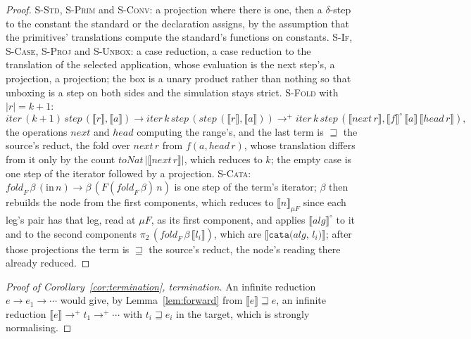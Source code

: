 \begin{proof}
\textsc{S-Std}, \textsc{S-Prim} and \textsc{S-Conv}: a projection where there is one, then a $\delta$-step to the constant the standard or the declaration assigns, by the assumption that the primitives' translations compute the standard's functions on constants.
\textsc{S-If}, \textsc{S-Case}, \textsc{S-Proj} and \textsc{S-Unbox}: a case reduction, a case reduction to the translation of the selected application, whose evaluation is the next step's, a projection, a projection; the box is a unary product rather than nothing so that unboxing is a step on both sides and the simulation stays strict.
\textsc{S-Fold} with $|r| = k + 1$:
\[ \mathit{iter}\,(k{+}1)\,\mathit{step}\,(\llbracket r \rrbracket, \llbracket a \rrbracket) \longrightarrow \mathit{iter}\,k\,\mathit{step}\,(\mathit{step}\,(\llbracket r \rrbracket, \llbracket a \rrbracket)) \longrightarrow^{+} \mathit{iter}\,k\,\mathit{step}\,(\llbracket \mathit{next}\,r \rrbracket, \llbracket f \rrbracket^{\!\circ}\,\llbracket a \rrbracket\,\llbracket \mathit{head}\,r \rrbracket), \]
the operations $\mathit{next}$ and $\mathit{head}$ computing the range's, and the last term is $\sqsupseteq$ the source's reduct, the fold over $\mathit{next}\,r$ from $f(a, \mathit{head}\,r)$, whose translation differs from it only by the count $\mathit{toNat}\,|\llbracket \mathit{next}\,r \rrbracket|$, which reduces to $k$; the empty case is one step of the iterator followed by a projection.
\textsc{S-Cata}: $\mathit{fold}_F\,\beta\,(\mathrm{in}\,n) \longrightarrow \beta\,(F(\mathit{fold}_F\,\beta)\,n)$ is one step of the term's iterator; $\beta$ then rebuilds the node from the first components, which reduces to $\llbracket n \rrbracket_{\mu F}$ since each leg's pair has that leg, read at $\mu F$, as its first component, and applies $\llbracket \mathit{alg} \rrbracket^{\!\circ}$ to it and to the second components $\pi_2\,(\mathit{fold}_F\,\beta\,\llbracket l_i \rrbracket)$, which are $\llbracket \texttt{cata(}\mathit{alg}\texttt{, }l_i\texttt{)} \rrbracket$; after those projections the term is $\sqsupseteq$ the source's reduct, the node's reading there already reduced.
\end{proof}

\begin{proof}[Proof of Corollary~\ref{cor:termination}, termination]
An infinite reduction $e \longrightarrow e_1 \longrightarrow \cdots$ would give, by Lemma~\ref{lem:forward} from $\llbracket e \rrbracket \sqsupseteq e$, an infinite reduction $\llbracket e \rrbracket \longrightarrow^{+} t_1 \longrightarrow^{+} \cdots$ with $t_i \sqsupseteq e_i$ in the target, which is strongly normalising.
\end{proof}

